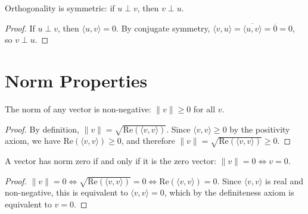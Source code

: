 \begin{lemma}
  \label{lemma : ortho_swap}
  \leanok
  Orthogonality is symmetric: if $u \perp v$, then $v \perp u$.
\end{lemma}
\begin{proof}
  If $u \perp v$, then $\langle u, v \rangle = 0$. By conjugate symmetry, $\langle v, u \rangle = \overline{\langle u, v \rangle} = \overline{0} = 0$, so $v \perp u$.
\end{proof}

\section{Norm Properties}

\begin{theorem}
  \label{theorem : norm_nonneg}
  \leanok
  The norm of any vector is non-negative: $\|v\| \geq 0$ for all $v$.
\end{theorem}
\begin{proof}
  By definition, $\|v\| = \sqrt{\text{Re}(\langle v, v \rangle)}$. Since $\langle v, v \rangle \geq 0$ by the positivity axiom, we have $\text{Re}(\langle v, v \rangle) \geq 0$, and therefore $\|v\| = \sqrt{\text{Re}(\langle v, v \rangle)} \geq 0$.
\end{proof}

\begin{theorem}
  \label{theorem : norm_zero}
  \leanok
  A vector has norm zero if and only if it is the zero vector: $\|v\| = 0 \iff v = 0$.
\end{theorem}
\begin{proof}
  $\|v\| = 0 \iff \sqrt{\text{Re}(\langle v, v \rangle)} = 0 \iff \text{Re}(\langle v, v \rangle) = 0$. Since $\langle v, v \rangle$ is real and non-negative, this is equivalent to $\langle v, v \rangle = 0$, which by the definiteness axiom is equivalent to $v = 0$.
\end{proof}

